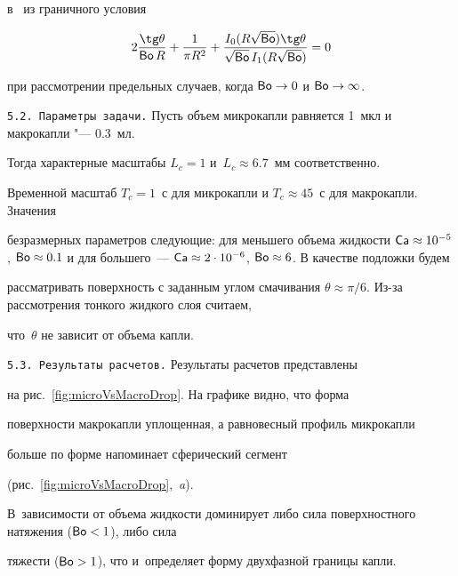 в~\cite{BartashevichKuznetsovKabov2010} из граничного условия

$$

2\frac{\tg \theta}{\Bo R} + \frac{1}{\pi R^2} + \frac{I_0( R \sqrt{\Bo} ) \tg \theta}{\sqrt{\Bo}\,I_1 ( R\sqrt{\Bo}

)} = 0

$$

при рассмотрении предельных случаев, когда $\Bo \to 0$ и $\Bo \to

\infty$.



\smallskip



\texttt{5.2. Параметры задачи.} Пусть объем микрокапли равняется 1~мкл и макрокапли "--- 0.3~мл. 

Тогда характерные масштабы $L_c = 1$ и~$L_c \approx 6.7$~мм соответственно. 

Временной масштаб $T_c = 1$~с для микрокапли и $T_c \approx 45$~с для макрокапли. Значения

безразмерных параметров следующие: для меньшего объема жидкости $\Ca

\approx 10^{-5}$, $\Bo \approx 0.1$ и для большего~--- $\Ca \approx

2\cdot 10^{-6}$, $\Bo \approx 6$. В качестве подложки будем

рассматривать поверхность с заданным углом смачивания $\theta

\approx \pi / 6$. Из-за рассмотрения тонкого жидкого слоя считаем,

что~$\theta$ не зависит от объема капли.



\smallskip



\texttt{5.3. Результаты расчетов.} Результаты расчетов представлены

на рис.~\ref{fig:microVsMacroDrop}. На графике видно, что форма

поверхности макрокапли уплощенная, а равновесный профиль микрокапли

больше по форме напоминает сферический сегмент

(рис.~\ref{fig:microVsMacroDrop},~{\sl a}). 

В~зависимости от объема жидкости доминирует либо сила поверхностного натяжения ($\mathop{\mathsf{Bo}}<1$), либо сила

тяжести ($\mathop{\mathsf{Bo}}>1$), что и~определяет форму двухфазной границы капли.



